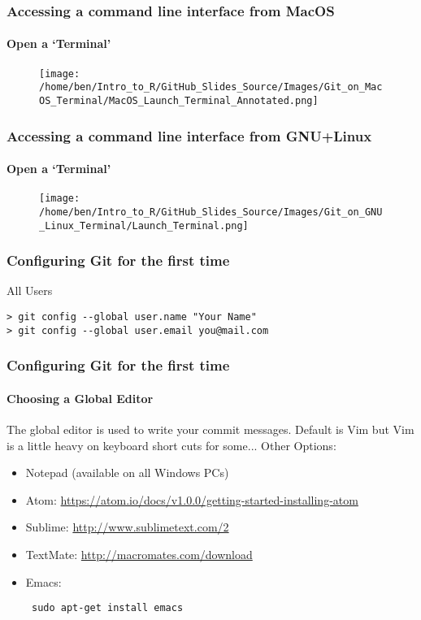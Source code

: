 \documentclass[xcolor=dvipsnames]{beamer}
\begin{document}
\begin{frame}
\frametitle{Accessing a command line interface from MacOS}
\framesubtitle{Open a `Terminal'}
\begin{center}
\begin{figure}
\texttt{[image: /home/ben/Intro\_to\_R/GitHub\_Slides\_Source/Images/Git\_on\_MacOS\_Terminal/MacOS\_Launch\_Terminal\_Annotated.png]} 
\end{figure}
\end{center}
\end{frame}

\begin{frame}
\frametitle{Accessing a command line interface from GNU+Linux}
\framesubtitle{Open a `Terminal'}
\begin{center}
\begin{figure}
\texttt{[image: /home/ben/Intro\_to\_R/GitHub\_Slides\_Source/Images/Git\_on\_GNU\_Linux\_Terminal/Launch\_Terminal.png]}
\end{figure}
\end{center}
\end{frame}

\begin{frame}[fragile]
\frametitle{Configuring Git for the first time}
\begin{block}{All Users}
\begin{lstlisting}
> git config --global user.name "Your Name"
> git config --global user.email you@mail.com
\end{lstlisting}
\end{block}
\end{frame}

\begin{frame}[fragile]
\frametitle{Configuring Git for the first time}
\framesubtitle{Choosing a Global Editor}
The global editor is used to write your commit messages.
\newline
\newline
Default is Vim but Vim is a little heavy on keyboard short cuts for some...
\newline
\newline
Other Options: \begin{itemize}
\item Notepad (available on all Windows PCs)
\item Atom: \url{https://atom.io/docs/v1.0.0/getting-started-installing-atom}
\item Sublime: \url{http://www.sublimetext.com/2}
\item TextMate: \url{http://macromates.com/download}
\item Emacs: \begin{verbatim} sudo apt-get install emacs \end{verbatim} 
\end{itemize}

\end{frame}
\end{document}
